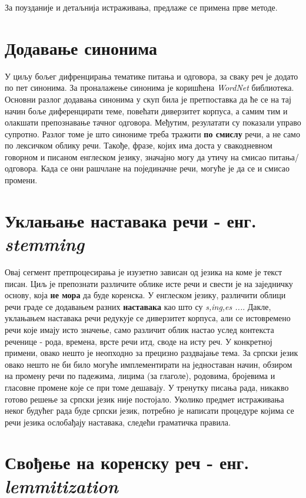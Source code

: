 За поузданије и детаљнија истраживања, предлаже се примена прве методе. 
 
 	
\section{Додавање синонима}
У циљу бољег дифренцирања тематике питања и одговора, за сваку реч је додато по пет синонима. За проналажење синонима је коришћена \textit{WordNet} библиотека. Основни разлог додавања синонима у скуп била је претпоставка да ће се на тај начин боље диференцирати теме, повећати диверзитет корпуса, а самим тим и олакшати препознавање тачног одговора. 
Међутим, резулатати су показали управо супротно. Разлог томе је што синониме треба тражити \textbf{по смислу} речи, а не само по лексичком облику речи. Такође, фразе, којих има доста у свакодневном говорном и писаном енглеском језику, значајно могу да утичу на смисао питања/одговора. Када се они рашчлане на појединачне речи, могуће је да се и смисао промени.

\section{Уклањање наставака речи - енг. \textit{stemming}}
	
Овај сегмент претпроцесирања је изузетно зависан од језика на коме је текст писан. Циљ је препознати различите облике исте речи и свести је на заједничку основу, која \textbf{не мора} да буде коренска. У енглеском језику, различити облици речи граде се додавањем разних \textbf{наставака} као што су \textit{s,ing,es ...}. Дакле, уклањањем наставака речи редукује се диверзитет корпуса, али се истовремено речи које имају исто значење, само различит облик настао услед контекста реченице - рода, времена, врсте речи итд, своде на исту реч. У конкретној примени, овако нешто је неопходно за прецизно раздвајање тема. 
За српски језик овако нешто не би било могуће имплементирати на једноставан начин, обзиром на промену речи по падежима, лицима (за глаголе), родовима, бројевима и гласовне промене које се при томе дешавају. У тренутку писања рада, никакво готово решење за српски језик није постојало. Уколико предмет истраживања неког будућег рада буде српски језик, потребно је написати процедуре којима се речи језика ослобађају наставака, следећи граматичка правила.

	
\section{Свођење на коренску реч - енг. \textit{lemmitization}}

